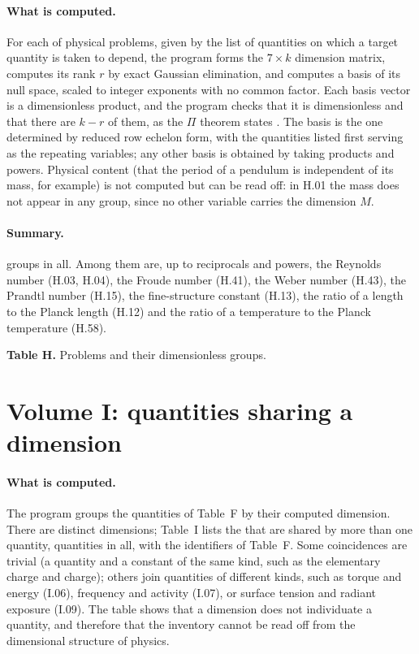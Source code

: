 \paragraph{What is computed.} For each of \vvNH{} physical problems, given by the list of quantities on which a target quantity is taken to depend, the program forms the $7 \times k$ dimension matrix, computes its rank $r$ by exact Gaussian elimination, and computes a basis of its null space, scaled to integer exponents with no common factor. Each basis vector is a dimensionless product, and the program checks that it is dimensionless and that there are $k - r$ of them, as the $\Pi$ theorem states \citep{Buckingham1914}. The basis is the one determined by reduced row echelon form, with the quantities listed first serving as the repeating variables; any other basis is obtained by taking products and powers. Physical content (that the period of a pendulum is independent of its mass, for example) is not computed but can be read off: in H.01 the mass does not appear in any group, since no other variable carries the dimension $M$.

\paragraph{Summary.} \vvNHgroups{} groups in all. Among them are, up to reciprocals and powers, the Reynolds number (H.03, H.04), the Froude number (H.41), the Weber number (H.43), the Prandtl number (H.15), the fine-structure constant (H.13), the ratio of a length to the Planck length (H.12) and the ratio of a temperature to the Planck temperature (H.58).

\begin{center}\textbf{Table H.} Problems and their dimensionless groups.\end{center}


\section{Volume I: quantities sharing a dimension}\label{app:i}

\paragraph{What is computed.} The program groups the \vvNF{} quantities of Table~F by their computed dimension. There are \vvNIclasses{} distinct dimensions; Table~I lists the \vvNImulti{} that are shared by more than one quantity, \vvNIinmulti{} quantities in all, with the identifiers of Table~F. Some coincidences are trivial (a quantity and a constant of the same kind, such as the elementary charge and charge); others join quantities of different kinds, such as torque and energy (I.06), frequency and activity (I.07), or surface tension and radiant exposure (I.09). The table shows that a dimension does not individuate a quantity, and therefore that the inventory cannot be read off from the dimensional structure of physics.

